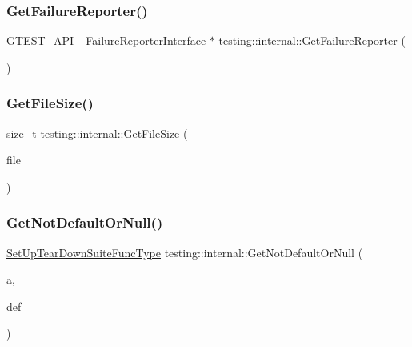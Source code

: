 \mbox{\label{namespacetesting_1_1internal_a93a00bf550dcc6b1de870d24c624869c}} 
\subsubsection{\texorpdfstring{GetFailureReporter()}{GetFailureReporter()}}
{\footnotesize\ttfamily \mbox{\hyperlink{_obj__test_2lib_2googletest-release-1_88_81_2googletest_2include_2gtest_2internal_2gtest-port_8h_aa73be6f0ba4a7456180a94904ce17790}{G\+T\+E\+S\+T\+\_\+\+A\+P\+I\+\_\+}} Failure\+Reporter\+Interface $\ast$ testing\+::internal\+::\+Get\+Failure\+Reporter (\begin{DoxyParamCaption}{ }\end{DoxyParamCaption})}

\mbox{\label{namespacetesting_1_1internal_a06ca3f65f5e85c9ce7299b9e4cd52408}} 
\subsubsection{\texorpdfstring{GetFileSize()}{GetFileSize()}}
{\footnotesize\ttfamily size\+\_\+t testing\+::internal\+::\+Get\+File\+Size (\begin{DoxyParamCaption}\item[{F\+I\+LE $\ast$}]{file }\end{DoxyParamCaption})}

\mbox{\label{namespacetesting_1_1internal_a9579a78c229ea302caded45d65f77336}} 
\subsubsection{\texorpdfstring{GetNotDefaultOrNull()}{GetNotDefaultOrNull()}}
{\footnotesize\ttfamily \mbox{\hyperlink{namespacetesting_1_1internal_a754d337f5d643225115fb28f6b1d6fb1}{Set\+Up\+Tear\+Down\+Suite\+Func\+Type}} testing\+::internal\+::\+Get\+Not\+Default\+Or\+Null (\begin{DoxyParamCaption}\item[{\mbox{\hyperlink{namespacetesting_1_1internal_a754d337f5d643225115fb28f6b1d6fb1}{Set\+Up\+Tear\+Down\+Suite\+Func\+Type}}}]{a,  }\item[{\mbox{\hyperlink{namespacetesting_1_1internal_a754d337f5d643225115fb28f6b1d6fb1}{Set\+Up\+Tear\+Down\+Suite\+Func\+Type}}}]{def }\end{DoxyParamCaption})\hspace{0.3cm}{\ttfamily [inline]}}


